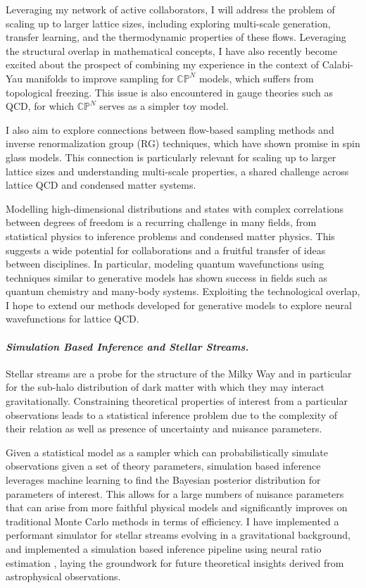 \documentclass[12pt]{article}
\begin{document}
\textbf{\color{royalblue}{Future Directions.}}
Leveraging my network of active collaborators, I will address the problem of scaling up to larger lattice sizes, including exploring multi-scale generation, transfer learning, and the thermodynamic properties of these flows. Leveraging the structural overlap in mathematical concepts, I have also recently become excited about the prospect of combining my experience in the context of Calabi-Yau manifolds to improve sampling for $\mathbb{CP}^N$ models, which suffers from topological freezing. This issue is also encountered in gauge theories such as QCD, for which $\mathbb{CP}^N$ serves as a simpler toy model.

I also aim to explore connections between flow-based sampling methods and inverse renormalization group (RG) techniques, which have shown promise in spin glass models. This connection is particularly relevant for scaling up to larger lattice sizes and understanding multi-scale properties, a shared challenge across lattice QCD and condensed matter systems.

Modelling high-dimensional distributions and states with complex correlations between degrees of freedom is a recurring challenge in many fields, from statistical physics to inference problems and condensed matter physics.
This suggests a wide potential for collaborations and a fruitful transfer of ideas between disciplines.
In particular, modeling quantum wavefunctions using techniques similar to generative models has shown success in fields such as quantum chemistry and many-body systems. Exploiting the technological overlap, I hope to extend our methods developed for generative models to explore neural wavefunctions for lattice QCD.


\paragraph{\textit{{Simulation Based Inference and Stellar Streams.}}}
Stellar streams are a probe for the structure of the Milky Way and in particular for the sub-halo distribution of dark matter with which they may interact gravitationally. Constraining theoretical properties of interest from a particular observations leads to a statistical inference problem due to the complexity of their relation as well as presence of uncertainty and nuisance parameters.

Given a statistical model as a sampler which can probabilistically simulate observations given a set of theory parameters, simulation based inference leverages machine learning to find the Bayesian posterior distribution for parameters of interest.
This allows for a large numbers of nuisance parameters that can arise from more faithful physical models and significantly improves on traditional Monte Carlo methods in terms of efficiency.
I have implemented a performant simulator for stellar streams evolving in a gravitational background, and implemented a simulation based inference pipeline using neural ratio estimation \cite{alvey2023AlbatrossScalable}, laying the groundwork for future theoretical insights derived from astrophysical observations.
\end{document}
